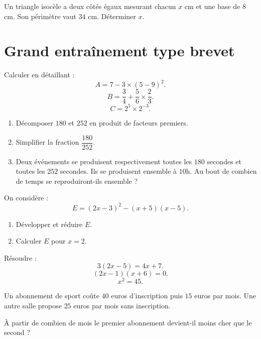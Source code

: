 \documentclass[11pt,a4paper]{article}
\newcounter{exercice}
\begin{document}
\begin{exercice}
Un triangle isocèle a deux côtés égaux mesurant chacun $x$ cm et une base de $8$ cm. Son périmètre vaut $34$ cm. Déterminer $x$.
\end{exercice}

\newpage

\section{Grand entraînement type brevet}

\begin{exercice}
Calculer en détaillant :
\[
A=7-3\times(5-9)^2.
\]
\[
B=\frac{3}{4}+\frac{5}{6}\times\frac{2}{3}.
\]
\[
C=2^5\times2^{-3}.
\]
\end{exercice}

\begin{exercice}[Arithmétique]
\begin{enumerate}
  \item Décomposer $180$ et $252$ en produit de facteurs premiers.
  \item Simplifier la fraction $\dfrac{180}{252}$.
  \item Deux événements se produisent respectivement toutes les $180$ secondes et toutes les $252$ secondes. Ils se produisent ensemble à $10$h. Au bout de combien de temps se reproduiront-ils ensemble ?
\end{enumerate}
\end{exercice}

\begin{exercice}
On considère :
\[
E=(2x-3)^2-(x+5)(x-5).
\]
\begin{enumerate}
  \item Développer et réduire $E$.
  \item Calculer $E$ pour $x=2$.
\end{enumerate}
\end{exercice}

\begin{exercice}[Équations]
Résoudre :
\[
3(2x-5)=4x+7.
\]
\[
(2x-1)(x+6)=0.
\]
\[
x^2=45.
\]
\end{exercice}

\begin{exercice}
Un abonnement de sport coûte $40$ euros d'inscription puis $15$ euros par mois. Une autre salle propose $25$ euros par mois sans inscription.

À partir de combien de mois le premier abonnement devient-il moins cher que le second ?
\end{exercice}
\end{document}
